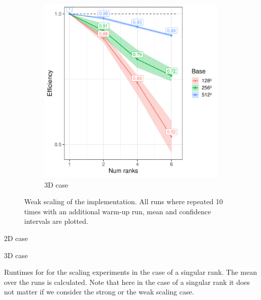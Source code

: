 \begin{figure}
\begin{subfigure}{0.49\textwidth}
        \includegraphics[width=\linewidth]{figures/experiments/scaling_weak_3d.pdf}
        \caption{3D case}
        \label{fig:scalingWeak3D}
    \end{subfigure}
    \caption{Weak scaling of the implementation. All runs where repeated 10 times with an additional warm-up run, mean and confidence intervals are plotted.}
    \label{fig:scalingWeak}
\end{figure}

\begin{table}
    \centering
    \begin{subtable}{0.49\textwidth}
        
        \caption{2D case}
        \label{tab:time2d}
    \end{subtable}
    \begin{subtable}{0.49\textwidth}
        
        \caption{3D case}
        \label{tab:time3d}
    \end{subtable}
    \caption{Runtimes for for the scaling experiments in the case of a singular rank. The mean over the runs is calculated. Note that here in the case of a singular rank it does not matter if we consider the strong or the weak scaling case.}
\end{table}


